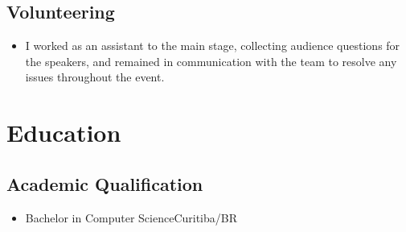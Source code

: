 \documentclass[a4paper, 12pt]{moderncv}
\begin{document}
\vspace{4pt}
\subsection{\small{Volunteering}}
\begin{itemize}
    \item{
            {\vspace{3pt}I worked as an assistant to the main stage, collecting
            audience questions for the speakers, and remained in communication
            with the team to resolve any issues throughout the event.}}
        \vspace{4pt}
\end{itemize}
\vspace{4pt}

\section{Education}
\vspace{1pt}
\subsection{\small{Academic Qualification}}
\vspace{2pt}
\begin{itemize}
    \item{
        {Bachelor in Computer Science}{Curitiba/BR}{}{}}
\end{itemize}
\vspace{4pt}
\end{document}
